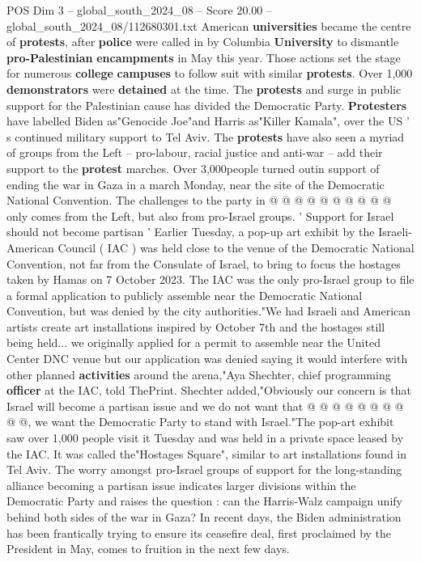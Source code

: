 \begin{textsample}{POS Dim 3 – global\_south\_2024\_08 – Score 20.00 – global\_south\_2024\_08/112680301.txt}
American \textbf{universities} became the centre of \textbf{protests}, after \textbf{police} were called in by Columbia \textbf{University} to dismantle \textbf{pro-Palestinian} \textbf{encampments} in May this year.
Those actions set the stage for numerous \textbf{college} \textbf{campuses} to follow suit with similar \textbf{protests}.
Over 1,000 \textbf{demonstrators} were \textbf{detained} at the time.
The \textbf{protests} and surge in public support for the Palestinian cause has divided the Democratic Party. \textbf{Protesters} have labelled Biden as"Genocide Joe"and Harris as"Killer Kamala", over the US ' s continued military support to Tel Aviv.
The \textbf{protests} have also seen a myriad of groups from the Left -- pro-labour, racial justice and anti-war -- add their support to the \textbf{protest} marches.
Over 3,000people turned outin support of ending the war in Gaza in a march Monday, near the site of the Democratic National Convention.
The challenges to the party in @ @ @ @ @ @ @ @ @ @ only comes from the Left, but also from pro-Israel groups. ' Support for Israel should not become partisan ' Earlier Tuesday, a pop-up art exhibit by the Israeli-American Council ( IAC ) was held close to the venue of the Democratic National Convention, not far from the Consulate of Israel, to bring to focus the hostages taken by Hamas on 7 October 2023.
The IAC was the only pro-Israel group to file a formal application to publicly assemble near the Democratic National Convention, but was denied by the city authorities."We had Israeli and American artists create art installations inspired by October 7th and the hostages still being held... we originally applied for a permit to assemble near the United Center DNC venue but our application was denied saying it would interfere with other planned \textbf{activities} around the arena,"Aya Shechter, chief programming \textbf{officer} at the IAC, told ThePrint.
Shechter added,"Obviously our concern is that Israel will become a partisan issue and we do not want that @ @ @ @ @ @ @ @ @ @, we want the Democratic Party to stand with Israel."The pop-art exhibit saw over 1,000 people visit it Tuesday and was held in a private space leased by the IAC.
It was called the"Hostages Square", similar to art installations found in Tel Aviv.
The worry amongst pro-Israel groups of support for the long-standing alliance becoming a partisan issue indicates larger divisions within the Democratic Party and raises the question : can the Harris-Walz campaign unify behind both sides of the war in Gaza?
In recent days, the Biden administration has been frantically trying to ensure its ceasefire deal, first proclaimed by the President in May, comes to fruition in the next few days.

\end{textsample}
